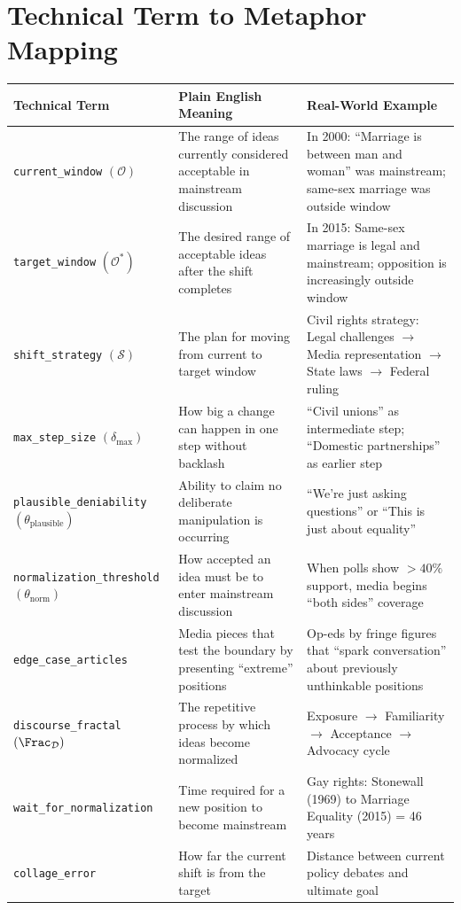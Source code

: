 \section{Technical Term to Metaphor Mapping}
\label{sec:overton-mapping}

\begin{center}
\small
\renewcommand{\arraystretch}{1.4}
\begin{tabularx}{\textwidth}{|>{\raggedright\arraybackslash}p{3.5cm}|>{\raggedright\arraybackslash}X|>{\raggedright\arraybackslash}X|}
\hline
\textbf{Technical Term} & \textbf{Plain English Meaning} & \textbf{Real-World Example} \\
\hline\hline
\texttt{current\_window} $(\mathcal{O})$ &
The range of ideas currently considered acceptable in mainstream discussion &
In 2000: ``Marriage is between man and woman'' was mainstream; same-sex marriage was outside window \\
\hline
\texttt{target\_window} $(\mathcal{O}^*)$ &
The desired range of acceptable ideas after the shift completes &
In 2015: Same-sex marriage is legal and mainstream; opposition is increasingly outside window \\
\hline
\texttt{shift\_strategy} $(\mathcal{S})$ &
The plan for moving from current to target window &
Civil rights strategy: Legal challenges $\to$ Media representation $\to$ State laws $\to$ Federal ruling \\
\hline
\texttt{max\_step\_size} $(\delta_{\max})$ &
How big a change can happen in one step without backlash &
``Civil unions'' as intermediate step; ``Domestic partnerships'' as earlier step \\
\hline
\texttt{plausible\_deniability} $(\theta_{\mathrm{plausible}})$ &
Ability to claim no deliberate manipulation is occurring &
``We're just asking questions'' or ``This is just about equality'' \\
\hline
\texttt{normalization\_threshold} $(\theta_{\mathrm{norm}})$ &
How accepted an idea must be to enter mainstream discussion &
When polls show $>40\%$ support, media begins ``both sides'' coverage \\
\hline
\texttt{edge\_case\_articles} &
Media pieces that test the boundary by presenting ``extreme'' positions &
Op-eds by fringe figures that ``spark conversation'' about previously unthinkable positions \\
\hline
\texttt{discourse\_fractal} $(\Frac_{\mathcal{D}})$ &
The repetitive process by which ideas become normalized &
Exposure $\to$ Familiarity $\to$ Acceptance $\to$ Advocacy cycle \\
\hline
\texttt{wait\_for\_normalization} &
Time required for a new position to become mainstream &
Gay rights: Stonewall (1969) to Marriage Equality (2015) = 46 years \\
\hline
\texttt{collage\_error} &
How far the current shift is from the target &
Distance between current policy debates and ultimate goal \\
\hline
\end{tabularx}
\end{center}


